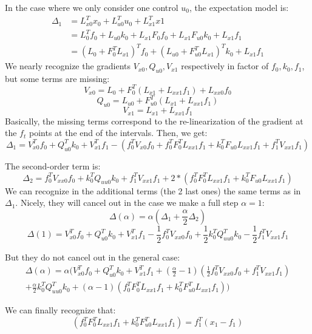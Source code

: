 \documentclass[10pt,a4paper]{article}
\begin{document}
In the case where we only consider one control $u_0$, the expectation model is:
\begin{align*}
  \Delta_1 &= L_{x0}^T x_0 + L_{u0}^T u_0 + L_{x1}^T x1 \\
  &= L_{0}^T f_0 + L_{u0} k_0 + L_{x1} F_{0} f_0  + L_{x1} F_{u0} k_0  + L_{x1} f_1 \\
  &= (L_0 + F_0^T L_{x1})^T f_0 + (L_{u0} + F_{u0}^T L_{x1})^T k_0 + L_{x1} f_1
\end{align*}
We nearly recognize the gradients $V_{x0}, Q_{u0}, V_{x1}$ respectively in factor of $f_0,k_0,f_1$, but some terms are missing:
$$V_{x0} = L_0 + F_0^T (L_{x1} + L_{xx1} f_1) + L_{xx0} f_0$$
$$Q_{u0} = L_{u0} + F_{u0}^T (L_{x1} + L_{xx1} f_1)$$
$$V_{x1} = L_{x1} + L_{xx1} f_1$$
Basically, the missing terms correspond to the re-linearization of the gradient at the $f_t$ points at the end of the intervals.
Then, we get:
$$\Delta_1 = V_{x0}^T f_0 + Q_{u0}^T k_0 + V_{x1}^T f_1 - \left( f_0^T V_{x0} f_0  + f_0^T F_0^T L_{xx1} f_1 + k_0^T F_{u0} L_{xx1} f_1 + f_1^T V_{xx1} f_1\right)$$

The second-order term is:
$$\Delta_2 = f_0^T V_{xx0} f_0 + k_0^T Q_{uu0} k_0 + f_1^T V_{xx1} f_1 + 2*(f_0^T F_0^T L_{xx1} f_1 + k_0^T F_{u0} L_{xx1} f_1)$$
We can recognize in the additional terms (the 2 last ones) the same terms as in $\Delta_1$.
Nicely, they will cancel out in the case we make a full step $\alpha=1$:
$$\Delta(\alpha) = \alpha( \Delta_1+\frac{\alpha}{2} \Delta_2)$$
$$\Delta(1)= V_{x0}^T f_0 + Q_{u0}^T k_0 + V_{x1}^T f_1 
- \frac{1}{2} f_0^T V_{xx0} f_0 + \frac{1}{2} k_0^T Q_{uu0}^T k_0 - \frac{1}{2} f_1^T V_{xx1} f_1 $$

But they do not cancel out in the general case:
\begin{align*}
  \Delta(\alpha) = \alpha \Big( V_{x0}^T f_0 + Q_{u0}^T k_0 + V_{x1}^T f_1 
+ (\frac{\alpha}{2}-1)( \frac{1}{2} f_0^T V_{xx0} f_0 + f_1^T V_{xx1} f_1 )\\
+ \frac{\alpha}{2} k_0^T Q_{uu0}^T k_0
+ (\alpha-1) ( f_0^T F_0^T L_{xx1} f_1 + k_0^T F_{u0}^T L_{xx1} f_1 ) \Big)
\end{align*}

We can finally recognize that:
$$( f_0^T F_0^T L_{xx1} f_1 + k_0^T F_{u0}^T L_{xx1} f_1 ) = f_1^T (x_1-f_1)$$



{
\small

}
\end{document}
